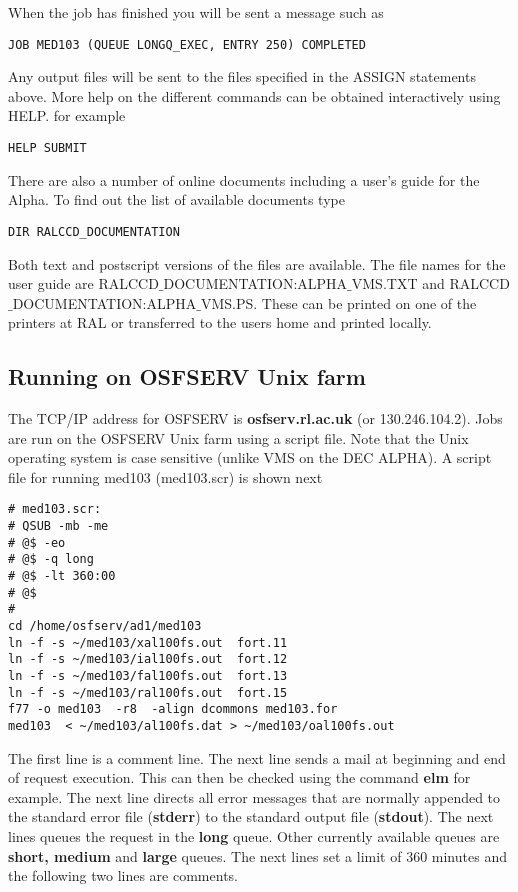When the job has finished you will be sent a message such as
\begin{verbatim}
JOB MED103 (QUEUE LONGQ_EXEC, ENTRY 250) COMPLETED
\end{verbatim}
Any output files will be sent to the files specified in the ASSIGN statements above.
More help on the different commands can be obtained interactively using HELP. for example
\begin{verbatim}
HELP SUBMIT
\end{verbatim}
There are also a number of online documents including a user's guide for the Alpha. To find out the list of 
available documents type  
\begin{verbatim}
DIR RALCCD_DOCUMENTATION
\end{verbatim}
Both text and postscript versions of the files are available. The file names for the user guide are
{RALCCD$\_$DOCUMENTATION:ALPHA$\_$VMS.TXT} and 
\newline
{RALCCD$\_$DOCUMENTATION:ALPHA$\_$VMS.PS}. These can be printed on
one of the printers at RAL or transferred to the users home and printed locally. 


 
\subsection{Running on OSFSERV Unix farm}
The TCP/IP address for OSFSERV is {\bf osfserv.rl.ac.uk}  
(or 130.246.104.2).
Jobs are run on the OSFSERV Unix farm using a script file. Note that the Unix
operating system is case sensitive (unlike VMS on the DEC ALPHA). A script file for running
med103 (med103.scr) is shown next
\begin{verbatim}
# med103.scr:
# QSUB -mb -me
# @$ -eo
# @$ -q long
# @$ -lt 360:00
# @$
#
cd /home/osfserv/ad1/med103
ln -f -s ~/med103/xal100fs.out  fort.11
ln -f -s ~/med103/ial100fs.out  fort.12 
ln -f -s ~/med103/fal100fs.out  fort.13
ln -f -s ~/med103/ral100fs.out  fort.15
f77 -o med103  -r8  -align dcommons med103.for  
med103  < ~/med103/al100fs.dat > ~/med103/oal100fs.out  
\end{verbatim}

The first line is a comment line. The next line
sends a mail at beginning and end of request execution. 
This can then be checked using the command {\bf elm} for example.
The next  line directs all error messages that are normally appended to the standard error file
({\bf stderr}) to the standard output file ({\bf stdout}). The next lines queues the request in the {\bf long} queue. 
Other currently available queues are {\bf short, medium} and {\bf large} queues. The next lines set a limit
of 360 minutes and the following two lines are comments. 

